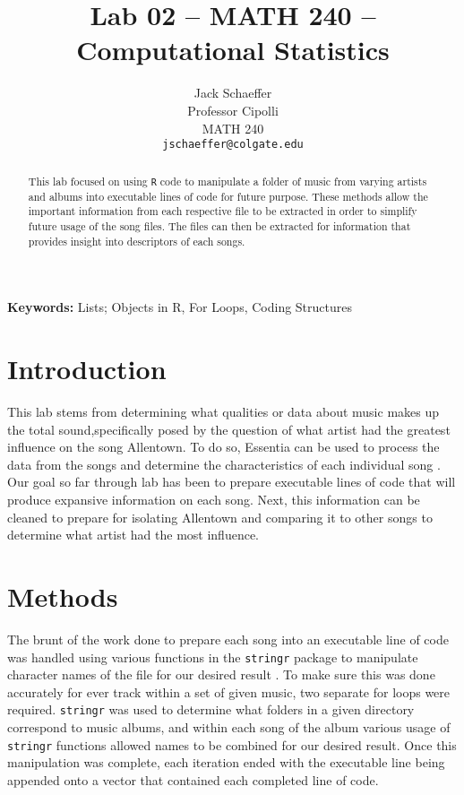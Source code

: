 \documentclass{article}\usepackage[]{graphicx}\usepackage[]{xcolor}
\begin{document}
\vspace{-1in}
\title{Lab 02 -- MATH 240 -- Computational Statistics}

\author{
  Jack Schaeffer \\
  Professor Cipolli \\
  MATH 240 \\
  {\tt jschaeffer@colgate.edu}
}

\date{}

\maketitle

\begin{multicols}{2}
\begin{abstract}
This lab focused on using \texttt{R} code to manipulate a folder of music from varying artists and albums into executable lines of code for future purpose. These methods allow the important information from each respective file to be extracted in order to simplify future usage of the song files. The files can then be extracted for information that provides insight into descriptors of each songs.
\end{abstract}

\noindent \textbf{Keywords:} Lists; Objects in R, For Loops, Coding Structures

\section{Introduction}
This lab stems from determining what qualities or data about music makes up the total sound,specifically posed by the question of what artist had the greatest influence on the song Allentown. To do so, Essentia can be used to process the data from the songs and determine the characteristics of each individual song \citep{essentia}. Our goal so far through lab has been to prepare executable lines of code that will produce expansive information on each song. Next, this information can be cleaned to prepare for isolating Allentown and comparing it to other songs to determine what artist had the most influence.


\section{Methods}
The brunt of the work done to prepare each song into an executable line of code was handled using various functions in the \texttt{stringr} package to manipulate character names of the file for our desired result \citep{stringr}. To make sure this was done accurately for ever track within a set of given music, two separate for loops were required. \texttt{stringr} was used to determine what folders in a given directory correspond to music albums, and within each song of the album various usage of \texttt{stringr} functions allowed names to be combined for our desired result. Once this manipulation was complete, each iteration ended with the executable line being appended onto a vector that contained each completed line of code.


\end{multicols}
\end{document}
